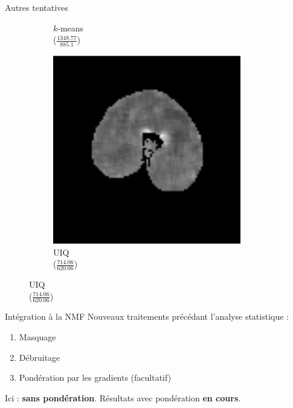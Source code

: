 \documentclass[10pt]{beamer}
\begin{document}
\begin{frame}{Autres tentatives}
\begin{figure}[ht]
\begin{subfigure}[t]{0.31\textwidth}
      \caption{$k$-means\\($\frac{1348.77}{885.1}$)}
      \label{subfig:cosine_kmeans}
    \end{subfigure}%
    \begin{subfigure}[t]{0.31\textwidth}
      \centering
      \includegraphics[width=0.9\textwidth]{fig/cosine_median}
      \caption{UIQ\\($\frac{714.06}{620.06}$)}
      \label{subfig:cosine_uiq}
    \end{subfigure}%

  \end{figure}
\end{frame}


\begin{frame}{Intégration à la NMF}
  Nouveaux traitements précédant l'analyse statistique :
  \begin{enumerate}
  \item Masquage
  \item Débruitage
  \item Pondération par les gradients (facultatif)
  \end{enumerate}

  Ici : \textbf{sans pondération}. Résultats avec pondération \textbf{en cours}.
\end{frame}
\end{document}
